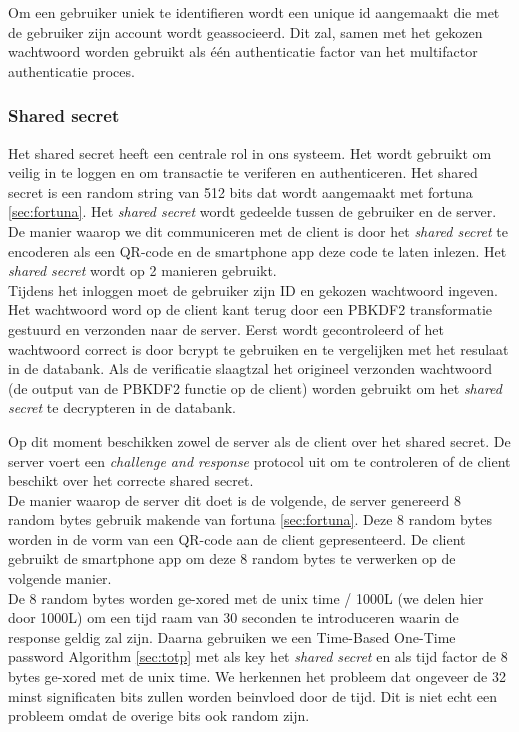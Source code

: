 \documentclass[11pt]{article}
\begin{document}
Om een gebruiker uniek te identifieren wordt een unique id aangemaakt die met de gebruiker zijn account wordt geassocieerd. Dit zal, samen met het gekozen wachtwoord worden gebruikt als één authenticatie factor van het multifactor authenticatie proces.
	
\subsubsection{Shared secret}
Het shared secret heeft een centrale rol in ons systeem. Het wordt gebruikt om veilig in te loggen en om transactie te veriferen en authenticeren. Het shared secret is een random string van 512 bits dat wordt aangemaakt met fortuna \ref{sec:fortuna}. 
Het \emph{shared secret} wordt gedeelde tussen de gebruiker en de server. De manier waarop we dit communiceren met de client is door het \emph{shared secret} te encoderen als een QR-code en de smartphone app deze code te laten inlezen. %
Het \emph{shared secret} wordt op 2 manieren gebruikt. \\
Tijdens het inloggen moet de gebruiker zijn ID en gekozen wachtwoord ingeven. Het wachtwoord word op de client kant terug door een PBKDF2 transformatie gestuurd en verzonden naar de server. Eerst wordt gecontroleerd of het wachtwoord correct is door bcrypt te gebruiken en te vergelijken met het resulaat in de databank. Als de verificatie slaagtzal het origineel verzonden wachtwoord (de output van de PBKDF2 functie op de client) worden gebruikt om het \emph{shared secret} te decrypteren in de databank.

Op dit moment beschikken zowel de server als de client over het shared secret. De server voert een \emph{challenge and response} protocol uit om te controleren of de client beschikt over het correcte shared secret.\\

De manier waarop de server dit doet is de volgende, de server genereerd 8 random bytes gebruik makende van fortuna \ref{sec:fortuna}. Deze 8 random bytes worden in de vorm van een QR-code aan de client gepresenteerd. De client gebruikt de smartphone app om deze 8 random bytes te verwerken op de volgende manier.\\

De 8 random bytes worden ge-xored met de unix time / 1000L (we delen hier door 1000L) om een tijd raam van 30 seconden te introduceren waarin de response geldig zal zijn. Daarna gebruiken we een Time-Based One-Time password Algorithm \ref{sec:totp} met als key het \emph{shared secret} en als tijd factor de 8 bytes ge-xored met de unix time. We herkennen het probleem dat ongeveer de 32 minst significaten bits zullen worden beinvloed door de tijd. Dit is niet echt een probleem omdat de overige bits ook random zijn.
\end{document}
